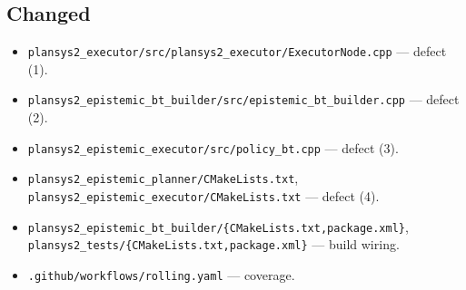 \documentclass[11pt,a4paper]{article}
\newcommand{\code}[1]{\texttt{\small #1}}
\begin{document}
\subsection*{Changed}
\begin{itemize}
  \item \code{plansys2\_executor/src/plansys2\_executor/ExecutorNode.cpp} --- defect (1).
  \item \code{plansys2\_epistemic\_bt\_builder/src/epistemic\_bt\_builder.cpp} --- defect (2).
  \item \code{plansys2\_epistemic\_executor/src/policy\_bt.cpp} --- defect (3).
  \item \code{plansys2\_epistemic\_planner/CMakeLists.txt},
    \code{plansys2\_epistemic\_executor/CMakeLists.txt} --- defect (4).
  \item \code{plansys2\_epistemic\_bt\_builder/\{CMakeLists.txt,package.xml\}},
    \code{plansys2\_tests/\{CMakeLists.txt,package.xml\}} --- build wiring.
  \item \code{.github/workflows/rolling.yaml} --- coverage.
\end{itemize}
\end{document}
